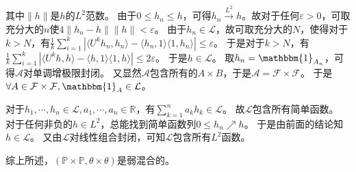 \documentclass{ctexart}
\newcommand{\norm}[1]{\lVert#1\rVert}
\begin{document}
\begin{solution}
  其中\(\norm{h} \)是\(h \)的\(L^2 \)范数。
  由于\(0 \leq h_n \leq h \)，可得\(h_n \overset{L^2}{\to}h \)。故对于任何\(\varepsilon>0 \)，可取充分大的\(n \)使\(4 \norm{h_n-h}\norm{h} < \varepsilon \)。
  由于\(h_n \in \mathcal{L} \)，故可取充分大的\(N \)，使得对于\(k>N \)，有\(\frac{1}{k}\sum_{i=1}^{k}|\langle U^kh_n,h_n\rangle - \langle h_n,1\rangle \langle 1,h_n\rangle | \leq \varepsilon \)。
  于是对于\(k>N \)，有\(\frac{1}{k}\sum_{i=1}^{k}|\langle U^kh,h\rangle - \langle h,1\rangle \langle 1,h\rangle | \leq 2\varepsilon \)。
  于是\(h \in \mathcal{L} \)。
  取\(h_n = \mathbbm{1}_{A_n} \)，可得\(\mathcal{A} \)对单调增极限封闭。
  又显然\(\mathcal{A} \)包含所有的\(A \times B \)，于是\(\mathcal{A} = \mathcal{F} \times \mathcal{F} \)。
  于是\(\forall A \in \mathcal{F} \times \mathcal{F},\mathbbm{1}_A \in \mathcal{L} \)。

  对于\(h_{1},\cdots,h_n \in \mathcal{L},a_{1},\cdots,a_n \in \mathbb{R} \)，有\(\sum_{k = 1}^{n}a_k h_k \in \mathcal{L} \)。
  故\(\mathcal{L} \)包含所有简单函数。
  对于任何非负的\(h \in L^2 \)，总能找到简单函数列\(0 \leq h_n \nearrow h \)。
  于是由前面的结论知\(h \in \mathcal{L} \)。
  又由\(\mathcal{L} \)对线性组合封闭，可知\(\mathcal{L} \)包含所有\(L^2 \)函数。

  综上所述，\((\mathbb{P} \times \mathbb{P},\theta \times \theta) \)是弱混合的。
\end{solution}
\end{document}
